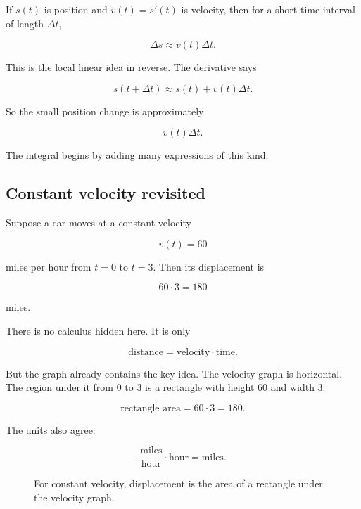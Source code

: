 If \(s(t)\) is position and \(v(t)=s'(t)\) is velocity, then for a short time interval of
length \(\Delta t\),

\[
\Delta s \approx v(t)\Delta t.
\]

This is the local linear idea in reverse.  The derivative says

\[
s(t+\Delta t)\approx s(t)+v(t)\Delta t.
\]

So the small position change is approximately

\[
v(t)\Delta t.
\]

The integral begins by adding many expressions of this kind.

\subsection{Constant velocity revisited}
\label{subsec:constant-velocity-revisited}

Suppose a car moves at a constant velocity

\[
v(t)=60
\]

miles per hour from \(t=0\) to \(t=3\).  Then its displacement is

\[
60\cdot 3=180
\]

miles.

There is no calculus hidden here.  It is only

\[
\text{distance}=\text{velocity}\cdot\text{time}.
\]

But the graph already contains the key idea.  The velocity graph is horizontal.  The
region under it from \(0\) to \(3\) is a rectangle with height \(60\) and width \(3\).

\[
\text{rectangle area}=60\cdot 3=180.
\]

The units also agree:

\[
\frac{\text{miles}}{\text{hour}}\cdot \text{hour}=\text{miles}.
\]

\begin{figure}[h]
\centering
{}
\caption{For constant velocity, displacement is the area of a rectangle under the velocity graph.}
\label{fig:constant-velocity-area}
\end{figure}

